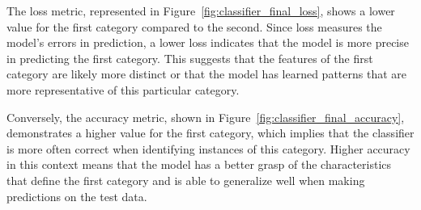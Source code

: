 The loss metric, represented in Figure~\ref{fig:classifier_final_loss}, shows a lower value for the first category compared to the second. Since loss measures the model's errors in prediction, a lower loss indicates that the model is more precise in predicting the first category. This suggests that the features of the first category are likely more distinct or that the model has learned patterns that are more representative of this particular category.

Conversely, the accuracy metric, shown in Figure~\ref{fig:classifier_final_accuracy}, demonstrates a higher value for the first category, which implies that the classifier is more often correct when identifying instances of this category. Higher accuracy in this context means that the model has a better grasp of the characteristics that define the first category and is able to generalize well when making predictions on the test data.
